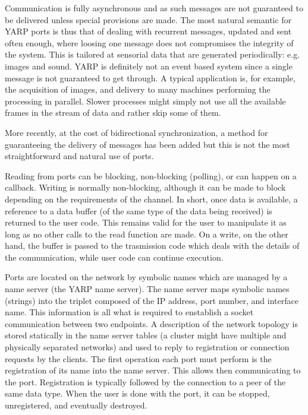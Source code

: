 Communication is fully asynchronous and as such messages are not guaranteed to be 
delivered unless special provisions are made. The most natural semantic for YARP ports is
thus that of dealing with recurrent messages, updated and sent often enough, where loosing 
one message does not compromises the integrity of the system. This is tailored at
sensorial data that are generated periodically: e.g. images and sound. YARP is definitely
not an event based system since a single message is not guaranteed to get through. A
typical application is, for example, the acquisition of images, and delivery to many 
machines performing the processing in parallel. Slower processes might simply not
use all the available frames in the stream of data and rather skip some of them.

More recently, at the cost of bidirectional synchronization, a method for guaranteeing
the delivery of messages has been added but this is not the most straightforward and
natural use of ports.

Reading from ports can be blocking, non-blocking (polling), or can happen on a callback.
Writing is normally non-blocking, although it can be made to block depending on the requirements of the channel. In short, once data is available, a reference to a data
buffer (of the same type of the data being received) is returned to the user code. This
remains valid for the user to manipulate it as long as no other calls to the read function
are made. 
On a write, on the other hand, the buffer is passed to the trasmission code which deals
with the details of the communication, while user code can continue execution.

Ports are located on the network by symbolic names which are managed by a name server
(the YARP name server). The name server maps symbolic names (strings) into the triplet 
composed of the IP address, port number, and interface name. This information is all 
what is required to enstablish a socket communication between two endpoints. 
A description of the network topology is stored statically in the name server tables (a
cluster might have multiple and physically separated networks) and used to reply to
registration or connection requests by the clients. The first operation each port must
perform is the registration of its name into the name server. This allows then
communicating to the port. Registration is typically followed by the connection to a peer
of the same data type. When the user is done with the port, it can be stopped,
unregistered, and eventually destroyed.


